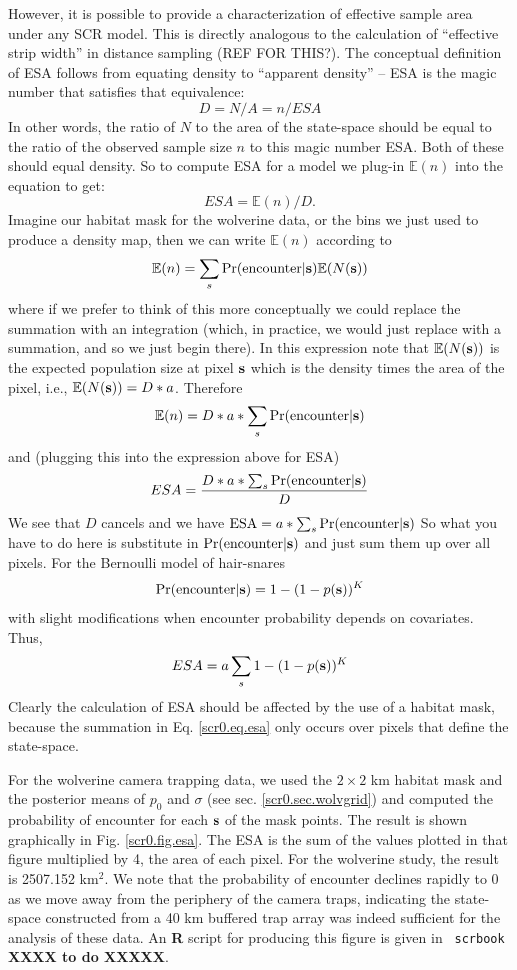 {However, it is possible to provide a characterization of effective
sample area under any SCR model.
This is directly
analogous to the calculation of ``effective strip width'' in distance
sampling (REF FOR THIS?).
The conceptual definition of ESA follows from equating density to
``apparent density'' -- ESA is the magic number that satisfies that equivalence:
\[
 D = N/A   = n/ESA
\]
In other words, the ratio of $N$ to the area of the state-space should be
equal to the ratio of the observed sample size $n$ to this magic number
ESA. Both of these should equal density.
So to compute ESA for a model we  plug-in $\mathbb{E}(n)$ into the equation to get:
\[
 ESA = \mathbb{E}(n)/D.
\]
Imagine our habitat mask for the wolverine data, or the bins we just
used to produce a density map, then we can write $\mathbb{E}(n)$
according to
\[
\mathbb{E}(n) = \sum_{s}  \Pr(\mbox{encounter} | {\bf s}) \mathbb{E}(
N({\bf s}) )
\]
where if we prefer to think of this more conceptually we could replace
the summation with an integration (which, in practice, we would just
replace with a summation, and so we just begin there).
In this expression note that
$\mathbb{E}(N({\bf s}))$ is the expected population size at pixel
${\bf s}$  which is the
density times the area of the pixel, i.e., $\mathbb{E}(N({\bf s}))= D*a$.
Therefore
\[
 \mathbb{E}(n) = D*a* \sum_{s} \Pr(\mbox{encounter} | {\bf s})
\]
and (plugging this into the expression above for ESA)
\[
 ESA = \frac{D*a*\sum_{s} \Pr(\mbox{encounter} | {\bf s}) }{D}
\]
We see that $D$ cancels and we have
$\mbox{ESA} = a*\sum_{s} \Pr(\mbox{encounter} | {\bf s})$
So what you have to do here is substitute in $\Pr(\mbox{encounter}|
{\bf s})$ and just sum them up over all pixels.  For the Bernoulli model of hair-snares
\[
\Pr(\mbox{encounter}|{\bf s}) =    1-(1-p({\bf s}))^{K}
\]
with slight modifications when encounter probability depends on
covariates. Thus,
\begin{equation}
ESA = a  \sum_{s}   1-(1-p({\bf s}))^{K}
\label{scr0.eq.esa}
\end{equation}
Clearly the calculation of ESA should be affected by the use of a
habitat mask, because the summation in Eq. \ref{scr0.eq.esa} only occurs over pixels
that define the state-space.

For the wolverine camera trapping data, we used the
$2 \times 2$ km habitat mask and the posterior means of $p_{0}$ and $\sigma$ (see
sec. \ref{scr0.sec.wolvgrid}) and computed the
probability of encounter for each ${\bf s}$ of the mask points. The
result is shown graphically in Fig. \ref{scr0.fig.esa}. The ESA
is the sum of the values plotted in that figure multiplied by 4, the
area of each pixel. For the wolverine study, the result is
2507.152 km$^2$. We note that the probability of encounter declines
rapidly to 0 as we move away from the periphery of the camera traps,
indicating the state-space constructed from a 40 km buffered trap
array was indeed sufficient for the analysis of these data.
An {\bf R} script for producing this figure is given in \mbox{\tt
  scrbook} {\bf XXXX to do XXXXX}.

}
